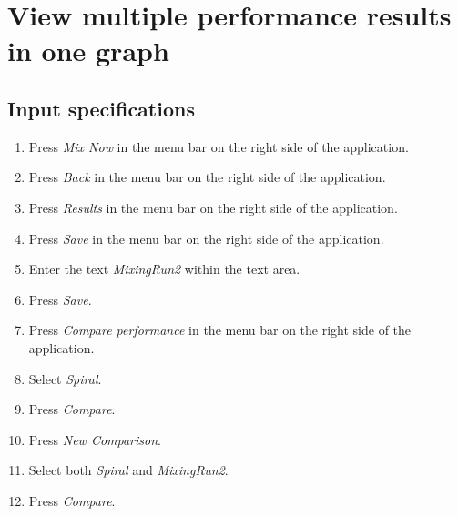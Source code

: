 \section{View multiple performance results in one graph}

\subsection*{Input specifications}
\begin{enumerate}
\item Press \emph{Mix Now} in the menu bar on the right side of the application.
\item Press \emph{Back} in the menu bar on the right side of the application.
\item Press \emph{Results} in the menu bar on the right side of the application.
\item Press \emph{Save} in the menu bar on the right side of the application.
\item Enter the text \emph{MixingRun2} within the text area.

\item Press \emph{Save}.
\item Press \emph{Compare performance} in the menu bar on the right side of the application.
\item Select \emph{Spiral}.
\item Press \emph{Compare}.
\item Press \emph{New Comparison}.

\item Select both \emph{Spiral} and \emph{MixingRun2}.
\item Press \emph{Compare}.
\end{enumerate}

